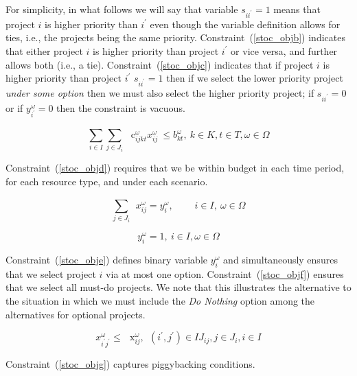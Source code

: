For simplicity, in what follows we will say that variable $s_{ii^{'}}=1$  means that project
$i$  is higher priority than $i^{'}$  even though the variable definition allows for ties,
i.e., the projects being the same priority. Constraint~(\ref{stoc_objb}) indicates that either
project  $i$  is higher priority than project  $i^{'}$  or vice versa, and further allows both
(i.e., a tie). Constraint~(\ref{stoc_objc}) indicates that if project  $i$  is higher priority
than project  $i^{'}$  $s_{ii^{'}}=1$  then if we select the lower priority project
\textit{under some option} then we must also select the higher priority project; if  $s_{ii^{'}}=0$
or if  $y_{i^{'}}^{\omega}=0$  then the constraint is vacuous.\par

\begin{equation}\label{stoc_objd}
 \sum _{i \in I}^{} \sum _{j \in J_{i}}^{}\text{~ c}_{ijkt}^{ \omega }x_{ij}^{ \omega }~  \leq  b_{kt}^{ \omega },~ k \in K, t \in T,  \omega  \in  \Omega
\end{equation}

Constraint~(\ref{stoc_objd}) requires that we be within budget in each time period, for each resource type, and under each scenario.

\begin{equation}\label{stoc_obje}
 \sum _{j \in J_{i}}^{}~~x_{ij}^{ \omega }= y_{i}^{ \omega },~~~~~~~~~~i \in I,~ \omega  \in  \Omega
\end{equation}

\begin{equation}\label{stoc_objf}
y_{i}^{ \omega }=1,~ i \in I,  \omega  \in  \Omega
\end{equation}

Constraint~(\ref{stoc_obje}) defines binary variable  $y_{i}^{ \omega }$  and simultaneously ensures that we select project  $i$  via at most one option. Constraint~(\ref{stoc_objf}) ensures that we select all must-do projects. We note that this illustrates the alternative to the situation in which we must include the {\it Do Nothing}  option among the alternatives for optional projects.\par

\begin{equation}\label{stoc_objg}
x_{i^{'}j^{'}}^{ \omega }  \leq \text{~ x}_{ij}^{ \omega },~~ \left( i^{'},j^{'} \right)  \in IJ_{ij} , j \in J_{i},i \in I
\end{equation}

Constraint~(\ref{stoc_objg}) captures piggybacking conditions.\par

